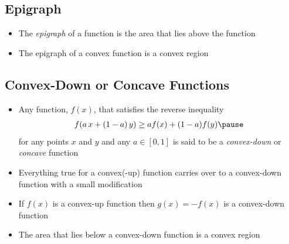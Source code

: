 
\begin{slide}
\section[-2]{Epigraph}

\begin{PauseHighLight}
  \begin{itemize}
  \item The \emph{epigraph} of a function is the area that lies above
    the function\pause
  \item The epigraph of a convex function is a convex region
    \begin{center}
      \pauseb
    \end{center}
  \end{itemize}
\end{PauseHighLight}

\end{slide}


\begin{slide}
\section[-2]{Convex-Down or Concave Functions}

\begin{PauseHighLight}
  \begin{itemize}
  \item Any function, $f(x)$, that satisfies the reverse inequality
    \begin{align*}
      f(a \,x + (1-a)\, y) \geq a f(x) + (1-a) f(y)\pause
    \end{align*}
    for any points $x$ and $y$ and any $a\in[0,1]$ is said to be a
    \emph{convex-down} or \emph{concave} function\pause
  \item Everything true for a convex(-up) function carries over to a
    convex-down function with a small modification\pause
  \item If $f(x)$ is a convex-up function then $g(x)=-f(x)$ is a
    convex-down function\pause
  \item The area that lies below a convex-down function is a convex
    region\pause
  \end{itemize}
\end{PauseHighLight}

\end{slide}

